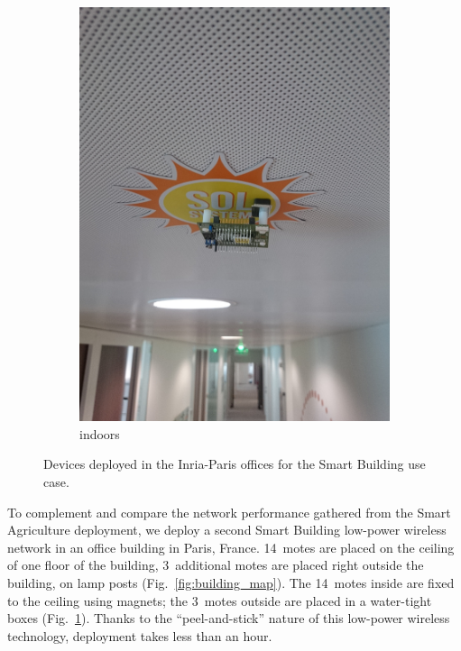 \documentclass{elsarticle}
\newcommand{\building}            {Smart Building\xspace}
\newcommand{\agri}                {Smart Agriculture\xspace}
\begin{document}
\begin{figure}
\begin{subfigure}[h]{0.49\textwidth}
        \includegraphics[width=\textwidth]{smartbuilding_indoor}
        \caption{indoors}
    \end{subfigure} 
    \caption{Devices deployed in the Inria-Paris offices for the \building use case.}
    \label{fig:building_pics}
\end{figure}


To complement and compare the network performance gathered from the \agri deployment, we deploy a second \building low-power wireless network in an office building in Paris, France.
14~motes are placed on the ceiling of one floor of the building, 3~additional motes are placed right outside the building, on lamp posts (Fig.~\ref{fig:building_map}).
The 14~motes inside are fixed to the ceiling using magnets; the 3~motes outside are placed in a water-tight boxes (Fig.~\ref{fig:building_pics}).
Thanks to the ``peel-and-stick'' nature of this low-power wireless technology, deployment takes less than an hour.
\end{document}
